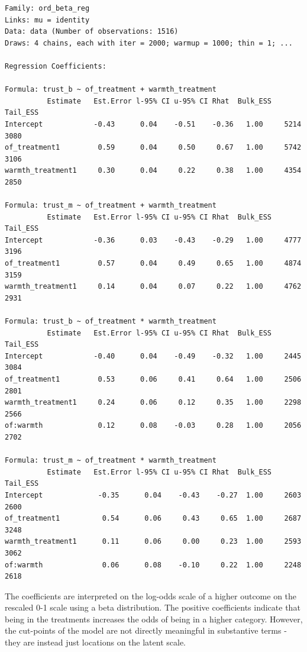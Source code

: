 \documentclass[12pt,letterpaper]{article}
\begin{document}
	
	
	{\small
		\begin{Verbatim}
Family: ord_beta_reg 
Links: mu = identity 
Data: data (Number of observations: 1516) 
Draws: 4 chains, each with iter = 2000; warmup = 1000; thin = 1; ... 

Regression Coefficients:

Formula: trust_b ~ of_treatment + warmth_treatment  
		  Estimate   Est.Error l-95% CI u-95% CI Rhat  Bulk_ESS  Tail_ESS
Intercept            -0.43      0.04    -0.51    -0.36   1.00     5214     3080
of_treatment1         0.59      0.04     0.50     0.67   1.00     5742     3106
warmth_treatment1     0.30      0.04     0.22     0.38   1.00     4354     2850

Formula: trust_m ~ of_treatment + warmth_treatment 
		  Estimate   Est.Error l-95% CI u-95% CI Rhat  Bulk_ESS  Tail_ESS
Intercept            -0.36      0.03    -0.43    -0.29   1.00     4777     3196
of_treatment1         0.57      0.04     0.49     0.65   1.00     4874     3159
warmth_treatment1     0.14      0.04     0.07     0.22   1.00     4762     2931

Formula: trust_b ~ of_treatment * warmth_treatment 
		  Estimate   Est.Error l-95% CI u-95% CI Rhat  Bulk_ESS  Tail_ESS
Intercept            -0.40      0.04    -0.49    -0.32   1.00     2445     3084
of_treatment1         0.53      0.06     0.41     0.64   1.00     2506     2801
warmth_treatment1     0.24      0.06     0.12     0.35   1.00     2298     2566
of:warmth             0.12      0.08    -0.03     0.28   1.00     2056     2702

Formula: trust_m ~ of_treatment * warmth_treatment
		  Estimate   Est.Error l-95% CI u-95% CI Rhat  Bulk_ESS  Tail_ESS
Intercept             -0.35      0.04    -0.43    -0.27  1.00     2603     2600
of_treatment1          0.54      0.06     0.43     0.65  1.00     2687     3248
warmth_treatment1      0.11      0.06     0.00     0.23  1.00     2593     3062
of:warmth              0.06      0.08    -0.10     0.22  1.00     2248     2618
		\end{Verbatim}
	} \FloatBarrier
	
	The coefficients are interpreted on the log-odds scale of a higher outcome on the rescaled 0-1 scale using a beta distribution. The positive coefficients indicate that being in the treatments increases the odds of being in a higher category. However, the cut-points of the model are not directly meaningful in substantive terms - they are instead  just locations on the latent scale. \\
	
\end{document}
